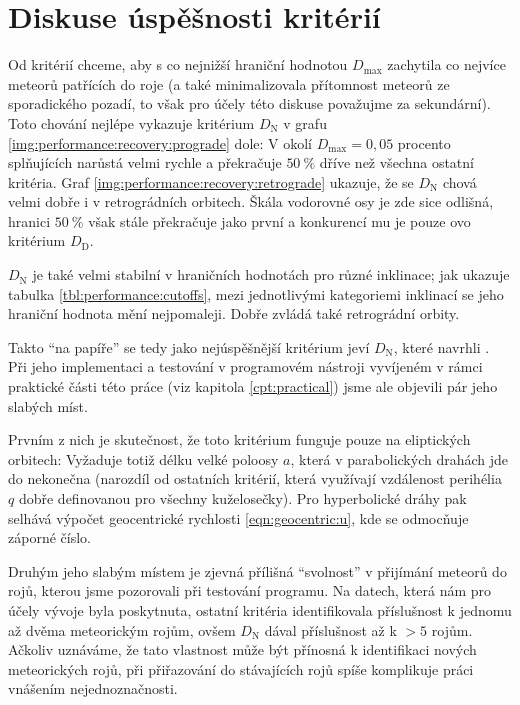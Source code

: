 \section{Diskuse úspěšnosti kritérií}%
Od kritérií chceme, aby s co nejnižší hraniční hodnotou $D_\text{max}$ zachytila co nejvíce meteorů patřících do roje (a také minimalizovala přítomnost meteorů ze sporadického pozadí, to však pro účely této diskuse považujme za sekundární). Toto chování nejlépe vykazuje kritérium $D_\text{N}$ v grafu \ref{img:performance:recovery:prograde} dole: V okolí $D_\text{max}=0{,}05$ procento splňujících narůstá velmi rychle a překračuje $50\:\%$ dříve než všechna ostatní kritéria. Graf \ref{img:performance:recovery:retrograde} ukazuje, že se $D_\text{N}$ chová velmi dobře i v retrográdních orbitech. Škála vodorovné osy je zde sice odlišná, hranici $50\:\%$ však stále překračuje jako první a konkurencí mu je pouze \citeauthor{cometassoc}ovo kritérium $D_\text{D}$.

$D_\text{N}$ je také velmi stabilní v hraničních hodnotách pro různé inklinace; jak ukazuje tabulka \ref{tbl:performance:cutoffs}, mezi jednotlivými kategoriemi inklinací se jeho hraniční hodnota mění nejpomaleji. Dobře zvládá také retrográdní orbity.

\smallskip

Takto "`na papíře"' se tedy jako nejúspěšnější kritérium jeví $D_\text{N}$, které navrhli \citeauthor{newapproach}. Při jeho implementaci a testování v programovém nástroji vyvíjeném v rámci praktické části této práce (viz kapitola \ref{cpt:practical}) jsme ale objevili pár jeho slabých míst.

Prvním z nich je skutečnost, že toto kritérium funguje pouze na eliptických orbitech: Vyžaduje totiž délku velké poloosy $a$, která v parabolických drahách jde do nekonečna (narozdíl od ostatních kritérií, která využívají vzdálenost perihélia $q$ dobře definovanou pro všechny kuželosečky). Pro hyperbolické dráhy pak selhává výpočet geocentrické rychlosti \eqref{eqn:geocentric:u}, kde se odmocňuje záporné číslo.

Druhým jeho slabým místem je zjevná přílišná "`svolnost"' v přijímání meteorů do rojů, kterou jsme pozorovali při testování programu. Na datech, která nám pro účely vývoje byla poskytnuta, ostatní kritéria identifikovala příslušnost k jednomu až dvěma meteorickým rojům, ovšem $D_\text{N}$ dával příslušnost až k $>5$ rojům. Ačkoliv uznáváme, že tato vlastnost může být přínosná k identifikaci nových meteorických rojů, při přiřazování do stávajících rojů spíše komplikuje práci vnášením nejednoznačnosti.


